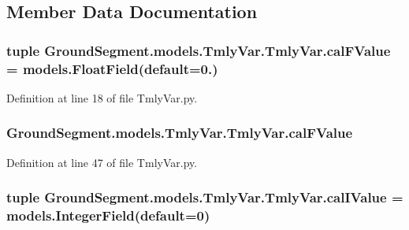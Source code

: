 \subsection{Member Data Documentation}
\hypertarget{class_ground_segment_1_1models_1_1_tmly_var_1_1_tmly_var_a1d579b5da80d996dad47a99a4ae4cea1}{}
\subsubsection[{cal\+F\+Value}]{\setlength{\rightskip}{0pt plus 5cm}tuple Ground\+Segment.\+models.\+Tmly\+Var.\+Tmly\+Var.\+cal\+F\+Value = models.\+Float\+Field(default=0.)\hspace{0.3cm}{\ttfamily [static]}}\label{class_ground_segment_1_1models_1_1_tmly_var_1_1_tmly_var_a1d579b5da80d996dad47a99a4ae4cea1}


Definition at line 18 of file Tmly\+Var.\+py.

\hypertarget{class_ground_segment_1_1models_1_1_tmly_var_1_1_tmly_var_aea75651bdf109b3105ef8b477f0985cc}{}
\subsubsection[{cal\+F\+Value}]{\setlength{\rightskip}{0pt plus 5cm}Ground\+Segment.\+models.\+Tmly\+Var.\+Tmly\+Var.\+cal\+F\+Value}\label{class_ground_segment_1_1models_1_1_tmly_var_1_1_tmly_var_aea75651bdf109b3105ef8b477f0985cc}


Definition at line 47 of file Tmly\+Var.\+py.

\hypertarget{class_ground_segment_1_1models_1_1_tmly_var_1_1_tmly_var_aee293dd968b0fa7700f66475eea0e32e}{}
\subsubsection[{cal\+I\+Value}]{\setlength{\rightskip}{0pt plus 5cm}tuple Ground\+Segment.\+models.\+Tmly\+Var.\+Tmly\+Var.\+cal\+I\+Value = models.\+Integer\+Field(default=0)\hspace{0.3cm}{\ttfamily [static]}}\label{class_ground_segment_1_1models_1_1_tmly_var_1_1_tmly_var_aee293dd968b0fa7700f66475eea0e32e}


